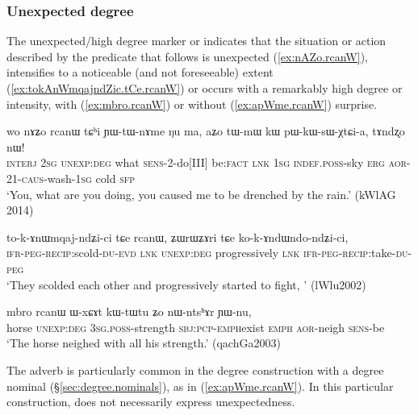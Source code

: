 \subsubsection{Unexpected degree} \label{sec:unexpected} 
The unexpected/high degree marker  or  indicates that the situation or action described by the predicate that follows is unexpected (\ref{ex:nAZo.rcanW}), intensifies to a noticeable (and not foreseeable) extent (\ref{ex:tokAnWmqajndZic.tCe.rcanW}) or occurs with a remarkably high degree or intensity, with  (\ref{ex:mbro.rcanW}) or without (\ref{ex:apWme.rcanW}) surprise.


\begin{exe}
	\ex \label{ex:nAZo.rcanW}
	\gll  wo nɤʑo rcanɯ tɕʰi ɲɯ-tɯ-nɤme ŋu ma,  aʑo tɯ-mɯ kɯ pɯ-kɯ-sɯ-χtɕi-a, tɤndʐo nɯ! \\
	\textsc{interj} \textsc{2sg} \textsc{unexp}:\textsc{deg} what \textsc{sens}-2-do[III] be:\textsc{fact} \textsc{lnk} \textsc{1sg} \textsc{indef}.\textsc{poss}-sky \textsc{erg} \textsc{aor}-2\fl{}1-\textsc{caus}-wash-\textsc{1sg} cold \textsc{sfp} \\
	\glt `You, what are you doing, you caused me to be drenched by the rain.' (kWlAG 2014) \\
\end{exe}

\begin{exe}
	\ex \label{ex:tokAnWmqajndZic.tCe.rcanW}
	\gll to-k-ɤnɯmqaj-ndʑi-ci tɕe rcanɯ, ʑɯrɯʑɤri tɕe ko-k-ɤndɯndo-ndʑi-ci, \\
	\textsc{ifr}-\textsc{peg}-\textsc{recip}:scold-\textsc{du}-\textsc{evd} \textsc{lnk}  \textsc{unexp}:\textsc{deg} progressively \textsc{lnk}   \textsc{ifr}-\textsc{peg}-\textsc{recip}:take-\textsc{du}-\textsc{peg} \\
	\glt `They scolded each other and progressively started to fight, ' (lWlu2002)
\end{exe}

\begin{exe}
	\ex \label{ex:mbro.rcanW}
	\gll mbro rcanɯ ɯ-xɕɤt kɯ-tɯ\redp{}tu ʑo nɯ-ntsʰɤr ɲɯ-nu, \\
	horse \textsc{unexp}:\textsc{deg} \textsc{3sg}.\textsc{poss}-strength \textsc{sbj}:\textsc{pcp}-\textsc{emph}\redp{}exist \textsc{emph} \textsc{aor}-neigh \textsc{sens}-be \\ 
	\glt `The horse neighed with all his strength.' (qachGa2003)
\end{exe}

The adverb  is particularly common in the degree construction with a  degree nominal (§\ref{sec:degree.nominals}), as in (\ref{ex:apWme.rcanW}). In this particular construction,   does not necessarily express unexpectedness.

